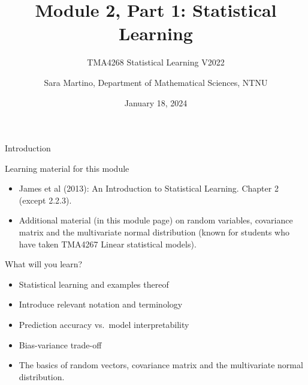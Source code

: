 \documentclass[
  ignorenonframetext,
]{beamer}
\title{Module 2, Part 1: Statistical Learning}
\subtitle{TMA4268 Statistical Learning V2022}
\author{Sara Martino, Department of Mathematical Sciences, NTNU}
\date{January 18, 2024}
\begin{document}
\frame{\titlepage}

\begin{frame}
\end{frame}

\begin{frame}{Introduction}
\protect\hypertarget{introduction}{}
\begin{block}{Learning material for this module}
\protect\hypertarget{learning-material-for-this-module}{}
\(~\)

\begin{itemize}
\item
  James et al (2013): An Introduction to Statistical Learning. Chapter 2
  (except 2.2.3).
\item
  Additional material (in this module page) on random variables,
  covariance matrix and the multivariate normal distribution (known for
  students who have taken TMA4267 Linear statistical models).
\end{itemize}
\end{block}
\end{frame}

\begin{frame}
\begin{block}{What will you learn?}
\protect\hypertarget{what-will-you-learn}{}
\vspace{2mm}

\begin{itemize}
\item
  Statistical learning and examples thereof \vspace{1mm}
\item
  Introduce relevant notation and terminology \vspace{1mm}
\item
  Prediction accuracy vs.~model interpretability \vspace{1mm}
\item
  Bias-variance trade-off \vspace{1mm}
\item
  The basics of random vectors, covariance matrix and the multivariate
  normal distribution.
\end{itemize}
\end{block}
\end{frame}
\end{document}
